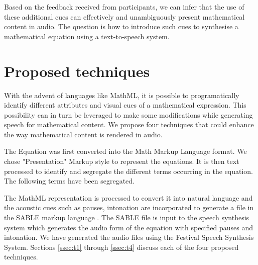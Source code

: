 \documentclass{article}
\begin{document}

Based on the feedback received from participants, we can infer that the use of these additional cues can effectively and unambiguously present mathematical content in audio.   The question is how to introduce such cues to synthesise a mathematical equation using a text-to-speech system.


\section{Proposed techniques}
\label{sec:techniques}
With the advent of languages like MathML, it is possible to programatically identify different attributes and visual cues of a mathematical expression. This possibility can in turn be leveraged to make some modifications  while generating speech for mathematical content.  We propose four techniques that could enhance the way mathematical content is rendered in audio.


The Equation was first converted into the Math Markup Language format. We chose "Presentation" Markup style to represent the equations.  
It is then text processed to identify and segregate the different terms occurring in the equation. The following terms have been segregated.


The MathML representation is processed to convert it into natural language and the acoustic cues such as pauses, intonation are incorporated to generate a file in the SABLE markup language \cite{sproat1998sable}. 
The SABLE file is input to the speech synthesis system which generates the audio form of the equation with specified pauses and intonation. We have generated the audio files using the Festival Speech Synthesis System\cite{black2002festival}. 
Sections \ref{ssec:t1} through \ref{ssec:t4} discuss each of the four proposed techniques. 
\end{document}
